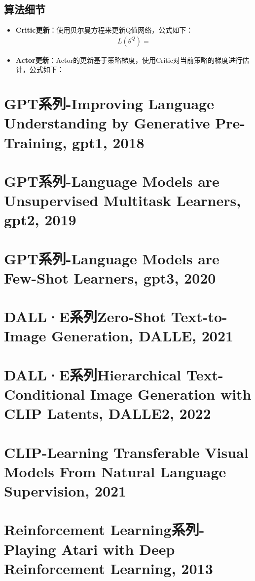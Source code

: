 \documentclass[twocolumn, 10pt]{article} %
\begin{document}
\subsection{算法细节}
\begin{itemize}
    \item \textbf{Critic更新}：使用贝尔曼方程来更新Q值网络，公式如下：
\begin{align}
L\left( \theta^{Q} \right) = 
\end{align}
\end{itemize}
\begin{itemize}
    \item \textbf{Actor更新}：Actor的更新基于策略梯度，使用Critic对当前策略的梯度进行估计，公式如下：
\end{itemize}


\section{ GPT系列-Improving Language Understanding by Generative Pre-Training, gpt1, 2018}

\section{GPT系列-Language Models are Unsupervised Multitask Learners, gpt2, 2019}

\section{GPT系列-Language Models are Few-Shot Learners, gpt3, 2020}


\section{DALL·E系列Zero-Shot Text-to-Image Generation, DALLE, 2021}

\section{DALL·E系列Hierarchical Text-Conditional Image Generation with CLIP Latents, DALLE2, 2022}

\section{CLIP-Learning Transferable Visual Models From Natural Language Supervision, 2021}


\section{Reinforcement Learning系列-Playing Atari with Deep Reinforcement Learning, 2013}
\end{document}
